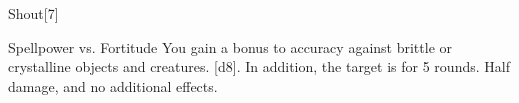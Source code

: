 \begin{spellsection}[Greater]{Shout}[7]
    \begin{spellheader}
    \end{spellheader}
    \begin{spellcontent}
        \begin{spelltargetinginfo}
        \end{spelltargetinginfo}
        \begin{spelleffects}
            \begin{spellattack}{Spellpower vs. Fortitude}
                \spellspecial You gain a  bonus to accuracy against brittle or crystalline objects and creatures.
                \spellsuccess {}[d8]. In addition, the target is \deafened for 5 rounds.
                \spellfailure Half damage, and no additional effects.
            \end{spellattack}
        \end{spelleffects}
    \end{spellcontent}
    \begin{spellfooter}
        \miscastexplode
    \end{spellfooter}
\end{spellsection}

